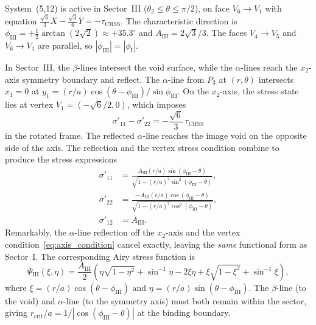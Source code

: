 \documentclass{svjour3} %
\newcommand{\tcrss}{\tau_{\mathrm{CRSS}}}
\begin{document}
System~(5,12) is active in Sector~III
($\theta_2 \leq \theta \leq \pi/2$), on face $V_6 \to V_1$ with
equation $\frac{\sqrt{6}}{3}X - \frac{\sqrt{3}}{6}Y = -\tcrss$.
The characteristic direction is
$\phi_{\mathrm{III}} = +\frac{1}{2}\arctan(2\sqrt{2}) \approx +35.3^\circ$
and $A_{\mathrm{III}} = 2\sqrt{3}/3$. The faces $V_4 \to V_5$ and
$V_6 \to V_1$ are parallel, so $|\phi_{\mathrm{III}}| =
|\phi_{\mathrm{I}}|$.

In Sector~III, the $\beta$-lines intersect the void surface, while the
$\alpha$-lines reach the $x_2$-axis symmetry boundary and reflect. The
$\alpha$-line from $P_3$ at $(r, \theta)$ intersects $x_1 = 0$ at
$y_1 = (r/a)\cos(\theta - \phi_{\mathrm{III}})/\sin\phi_{\mathrm{III}}$.
On the $x_2$-axis, the stress state lies at vertex
$V_1 = (-\sqrt{6}/2, 0)$, which imposes
\begin{equation}
\label{eq:axis_condition}
\sigma'_{11} - \sigma'_{22} = -\frac{\sqrt{6}}{3}\,\tcrss
\end{equation}
in the rotated frame. The reflected $\alpha$-line reaches the image void
on the opposite side of the axis. The reflection and the vertex stress
condition combine to produce the stress expressions
\begin{align}
\label{eq:s11_sector_III}
\sigma'_{11} &= \frac{A_{\mathrm{III}}(r/a)\sin(\phi_{\mathrm{III}} - \theta)}
  {\sqrt{1 - (r/a)^2\sin^2(\phi_{\mathrm{III}} - \theta)}}, \\
\label{eq:s22_sector_III}
\sigma'_{22} &= \frac{-A_{\mathrm{III}}(r/a)\cos(\phi_{\mathrm{III}} - \theta)}
  {\sqrt{1 - (r/a)^2\cos^2(\phi_{\mathrm{III}} - \theta)}}, \\
\sigma'_{12} &= A_{\mathrm{III}}.
\end{align}
Remarkably, the $\alpha$-line reflection off the $x_2$-axis and the
vertex condition~\eqref{eq:axis_condition} cancel exactly, leaving the
\emph{same} functional form as Sector~I.
The corresponding Airy stress function is
\begin{equation}
\label{eq:airy_III}
\Psi_{\mathrm{III}}(\xi, \eta) = \frac{A_{\mathrm{III}}}{2}
  \left(\eta\sqrt{1-\eta^2} + \sin^{-1}\eta
  - 2\xi\eta + \xi\sqrt{1-\xi^2} + \sin^{-1}\xi\right),
\end{equation}
where $\xi = (r/a)\cos(\theta - \phi_{\mathrm{III}})$ and
$\eta = (r/a)\sin(\theta - \phi_{\mathrm{III}})$.
The $\beta$-line (to the void) and $\alpha$-line (to the symmetry
axis) must both remain within the sector, giving
$r_{\mathrm{crit}}/a = 1/|\cos(\phi_{\mathrm{III}} - \theta)|$ at
the binding boundary.
\end{document}
